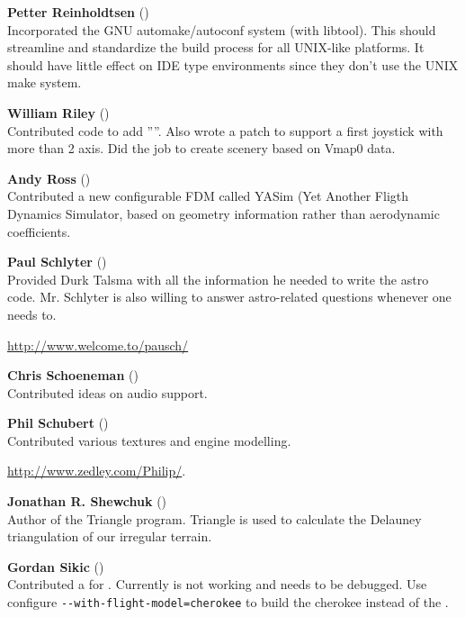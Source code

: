 \noindent \textbf{Petter Reinholdtsen}
()\\
  Incorporated the GNU automake/autoconf system (with libtool).
  This should streamline and standardize the build process for all
  UNIX-like platforms.  It should have little effect on IDE type
  environments since they don't use the UNIX make system.
 \medskip

\noindent \textbf{William Riley} ()\\
  Contributed code to add ''''. Also wrote a patch to support a first
  joystick with more than 2 axis. Did the job to create scenery based on Vmap0 data.
 \medskip
 
\noindent \textbf{Andy Ross} ()\\
 Contributed a new configurable FDM called YASim (Yet Another Fligth Dynamics Simulator, based on geometry information rather than aerodynamic coefficients.
 \medskip

\noindent \textbf{Paul Schlyter} ()\\
  Provided Durk Talsma with all the information he needed to write the
  astro code. Mr. Schlyter is also willing to answer astro-related questions
  whenever one needs to.
  \medskip
  
  \href{http://www.welcome.to/pausch/}{http://www.welcome.to/pausch/}
 \medskip

\noindent \textbf{Chris Schoeneman}
()\\
  Contributed ideas on audio support.
 \medskip

\noindent \textbf{Phil Schubert} ()\\
  Contributed various textures and engine modelling.
   \medskip

  \href{http://www.zedley.com/Philip/}{http://www.zedley.com/Philip/}.
  \medskip

 \noindent \textbf{Jonathan R. Shewchuk}
()\\
  Author of the Triangle program.  Triangle
  is used to calculate the  Delauney triangulation of our irregular terrain.
 \medskip

\noindent \textbf{Gordan Sikic} ()\\
  Contributed a  for .  Currently is not
  working and needs to be debugged.  Use configure
  \texttt{-$ $-with-flight-model=cherokee}
  to build the cherokee instead of the .
 \medskip

